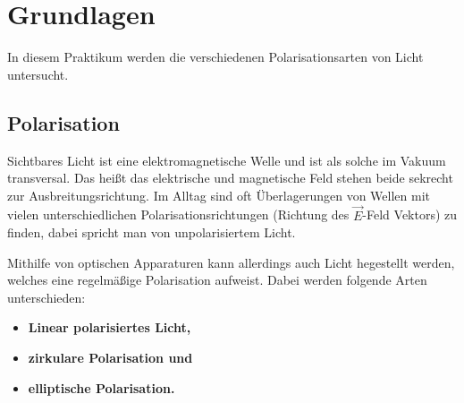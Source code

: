 \chapter{Grundlagen}

In diesem Praktikum werden die verschiedenen Polarisationsarten von Licht untersucht.

\section{Polarisation}

Sichtbares Licht ist eine elektromagnetische Welle und ist als solche im Vakuum transversal.
Das heißt das elektrische und magnetische Feld stehen beide sekrecht zur Ausbreitungsrichtung.
Im Alltag sind oft Überlagerungen von Wellen mit vielen unterschiedlichen Polarisationsrichtungen (Richtung des $\vec{E}$-Feld Vektors) zu finden, dabei spricht man von unpolarisiertem Licht.

Mithilfe von optischen Apparaturen kann allerdings auch Licht hegestellt werden, welches eine regelmäßige Polarisation aufweist.
Dabei werden folgende Arten unterschieden:

\begin{itemize}
	\item \textbf{Linear polarisiertes Licht,}
	\item \textbf{zirkulare Polarisation und}
	\item \textbf{elliptische Polarisation.}
\end{itemize}
